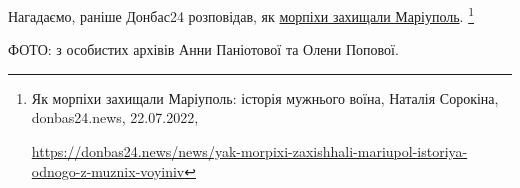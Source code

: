
Нагадаємо, раніше Донбас24 розповідав, як \href{https://donbas24.news/news/yak-morpixi-zaxishhali-mariupol-istoriya-odnogo-z-muznix-voyiniv}{морпіхи захищали Маріуполь}.%
\footnote{Як морпіхи захищали Маріуполь: історія мужнього воїна, Наталія Сорокіна, donbas24.news, 22.07.2022, \par\url{https://donbas24.news/news/yak-morpixi-zaxishhali-mariupol-istoriya-odnogo-z-muznix-voyiniv}}

ФОТО: з особистих архівів Анни Паніотової та Олени Попової.

